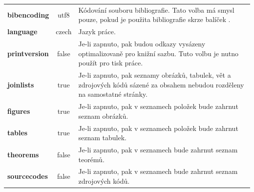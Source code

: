 \documentclass[
  biblatex,
  glossaries,
  index
]{kidiplom}
\begin{document}
\begin{table}
\begin{center}
{\begin{tabular}{>{\bfseries}l >{\ttfamily}c L{8cm}}
        bibencoding            & utf8                          & Kódování souboru bibliografie. Tato volba má smysl pouze, pokud je použita bibliografie skrze balíček \BibLaTeX{}.   \\

        language               & czech                         & Jazyk práce.                                                                                                         \\

        printversion           & false                         & Je-li zapnuto, pak budou odkazy vysázeny optimalizovaně pro knižní sazbu. Tuto volbu je nutno použít pro tisk práce. \\


        joinlists              & true                          & Je-li zapnuto, pak seznamy obrázků, tabulek, vět a
        zdrojových kódů sázené za obsahem nebudou rozděleny na samostatné stránky.                                                                                                    \\

        figures                & true                          & Je-li zapnuto, pak v seznamech položek bude zahrnut seznam obrázků.                                                  \\

        tables                 & true                          & Je-li zapnuto, pak v seznamech položek bude zahrnut seznam tabulek.                                                  \\

        theorems               & false                         & Je-li zapnuto, pak v seznamech bude zahrnut seznam teorémů.                                                          \\

        sourcecodes            & false                         & Je-li zapnuto, pak v seznamech bude zahrnut seznam zdrojových kódů.                                                  \\


\end{tabular}}
\end{center}
\end{table}
\end{document}
